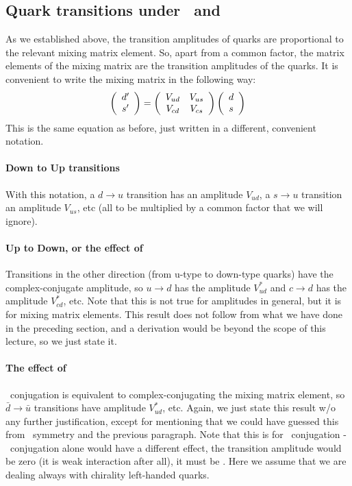 \subsection{Quark transitions under \cp\ and \ts}
 As we established above, the transition amplitudes of quarks are
 proportional to the relevant mixing matrix element. So, apart from a
 common factor, the matrix elements of the mixing matrix are the
 transition amplitudes of the quarks. It is convenient to write the
 mixing matrix in the following way:
\begin{equation}
  \left( \begin{array}{c} d^{\prime} \\ s^{\prime} \end{array} \right) =
  \left( \begin{array}{cc} V_{ud} & V_{us} \\ V_{cd} & V_{cs} \end{array} \right)
  \left( \begin{array}{c} d \\ s \end{array} \right)
\end{equation}
  This is the same equation as before, just written in a different,
  convenient notation.

\paragraph{Down to Up transitions}
  With this notation, a $d\to u$ transition has an
  amplitude $V_{ud}$, a $s \to u$ transition an amplitude $V_{us}$,
  etc (all to be multiplied by a common factor that we will ignore).

\paragraph{Up to Down, or the effect of \ts}
  Transitions in the other direction (from u-type to down-type quarks)
  have the complex-conjugate amplitude, so $u\to d$ has the amplitude
  $V^{*}_{ud}$ and $c\to d$ has the amplitude
  $V^{*}_{cd}$, etc. Note that this is not true for amplitudes in
  general, but it is for mixing matrix elements. This result does not
  follow from what we have done in the preceding section, and a
  derivation would be beyond the scope of this lecture, so we just
  state it.

\paragraph{The effect of \cp}
  \cp\ conjugation is equivalent to complex-conjugating the mixing
  matrix element, so $\bar{d} \to \bar{u}$ transitions have amplitude
  $V^{*}_{ud}$, etc. Again, we just state this result w/o any further
  justification, except for mentioning that we could have guessed this
  from \cpt\ symmetry and the previous paragraph. Note that this is
  for \cp\ conjugation - \cs\ conjugation alone would have a different
  effect, the transition amplitude would be zero (it is weak
  interaction after all), it must be \cp. Here we assume that we are
  dealing always with chirality left-handed quarks.


